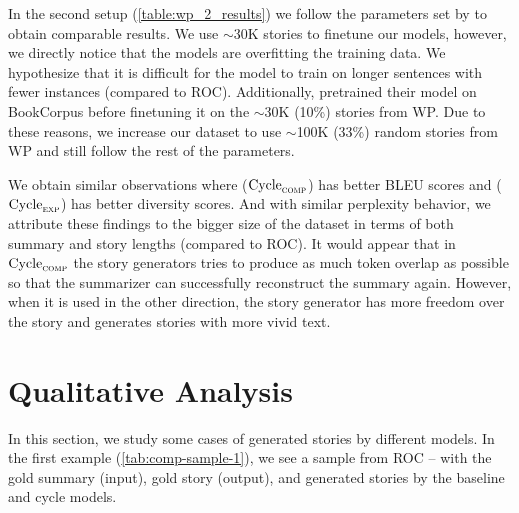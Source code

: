 In the second setup (\cref{table:wp_2_results}) we follow the parameters set by \citep{guan2021long} to obtain comparable results. We use $\sim$30K stories to finetune our models, however, we directly notice that the models are overfitting the training data. We hypothesize that it is difficult for the model to train on longer sentences with fewer instances (compared to ROC). Additionally, \citep{guan2021long} pretrained their model on BookCorpus before finetuning it on the $\sim$30K (10\%) stories from WP. Due to these reasons, we increase our dataset to use $\sim$100K (33\%) random stories from WP and still follow the rest of the parameters.

We obtain similar observations where ($\text{Cycle}_{\textsc{comp}}$) has better BLEU scores and ($\text{Cycle}_{\textsc{exp}}$) has better diversity scores. And with similar perplexity behavior, we attribute these findings to the bigger size of the dataset in terms of both summary and story lengths (compared to ROC). It would appear that in $\text{Cycle}_{\textsc{comp}}$ the story generators tries to produce as much token overlap as possible so that the summarizer can successfully reconstruct the summary again. However, when it is used in the other direction, the story generator has more freedom over the story and generates stories with more vivid text.




\section{Qualitative Analysis}

In this section, we study some cases of generated stories by different models. In the first example (\cref{tab:comp-sample-1}), we see a sample from ROC -- with the gold summary (input), gold story (output), and generated stories by the baseline and cycle models.

